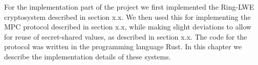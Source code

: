 \documentclass[../main.tex]{subfiles}
\begin{document}
\noindent For the implementation part of the project we first implemented the Ring-LWE cryptosystem described in section x.x. We then used this for implementing the MPC protocol described in section x.x, while making slight deviations to allow for reuse of secret-shared values, as described in section x.x. The code for the protocol was written in the programming language Rust.
In this chapter we describe the implementation details of these systems.
\end{document}
